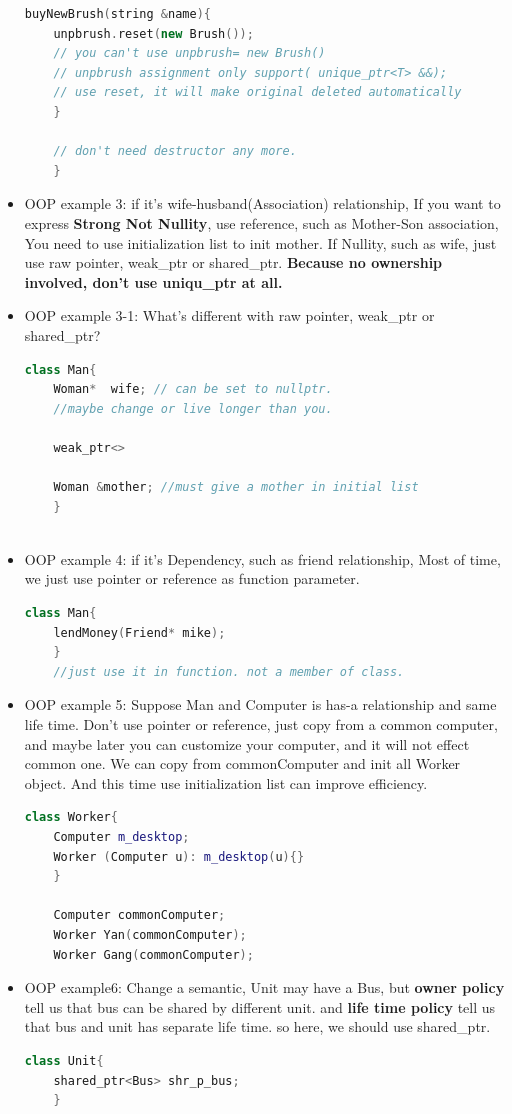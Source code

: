 \documentclass[a4paper,12pt,twoside]{book}
\begin{document}
\begin{itemize}
\begin{lstlisting}[frame=single, language=c++]
	buyNewBrush(string &name){
	unpbrush.reset(new Brush());
	// you can't use unpbrush= new Brush()
	// unpbrush assignment only support( unique_ptr<T> &&);
	// use reset, it will make original deleted automatically
	}
	
	// don't need destructor any more.
	}
	\end{lstlisting}
	
	\item OOP example 3: if it's wife-husband(Association) relationship, If you want to express \textbf{Strong Not Nullity}, use reference, such as Mother-Son association, You need to use initialization list to init mother. If Nullity, such as wife, just use raw pointer, weak\_ptr or shared\_ptr. \textbf{Because no ownership involved, don't use uniqu\_ptr at all. }
	
	\item OOP example 3-1: What's different with raw pointer, weak\_ptr or shared\_ptr?
	\begin{lstlisting}[frame=single, language=c++]
	class Man{
	Woman*  wife; // can be set to nullptr.
	//maybe change or live longer than you.
	
	weak_ptr<>
	
	Woman &mother; //must give a mother in initial list
	}
	
	\end{lstlisting}
	
	\item OOP example 4: if it's Dependency,  such as friend relationship,  Most of time, we just use pointer or reference as function parameter.
	\begin{lstlisting}[frame=single, language=c++]
	class Man{
	lendMoney(Friend* mike);
	}
	//just use it in function. not a member of class.
	\end{lstlisting}
	
	\item OOP example 5: Suppose Man and Computer is has-a relationship and same life time. Don't use pointer or reference, just copy from a common computer, and maybe later you can customize your computer, and it will not effect common one.  We can copy from commonComputer and init all Worker object.  And this time use initialization list can improve efficiency.
	\begin{lstlisting}[frame=single, language=c++]
	class Worker{
	Computer m_desktop;
	Worker (Computer u): m_desktop(u){}
	}
	
	Computer commonComputer;
	Worker Yan(commonComputer);
	Worker Gang(commonComputer);
	\end{lstlisting}
	
	
	\item OOP example6:  Change a semantic,  Unit may have a Bus, but \textbf{owner policy} tell us that bus can be shared by different unit. and \textbf{life time policy} tell us that bus and unit has separate life time. so here, we should use shared\_ptr.
	\begin{lstlisting}[frame=single, language=c++]
	class Unit{
	shared_ptr<Bus> shr_p_bus;
	}
	\end{lstlisting}
	
\end{itemize}
\end{document}
